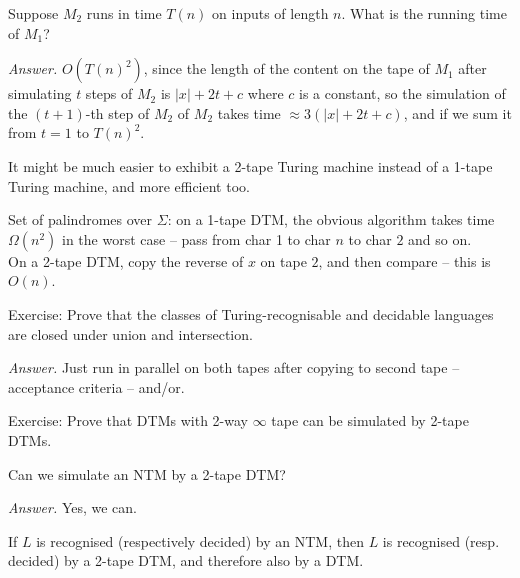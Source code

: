 \documentclass[a4paper]{article}
\newenvironment{ans}{\begin{breakbox}\textit{Answer.}}{\end{breakbox}}
\newcommand{\nl}{\vspace{0.2cm}\\}
\begin{document}
\begin{ques}
    Suppose $M_2$ runs in time $T(n)$ on inputs of length $n$. What is the running time of $M_1$?
\end{ques}

\begin{ans}
    $O(T(n)^2)$, since the length of the content on the tape of $M_1$ after simulating $t$ steps of $M_2$ is $|x| + 2t + c$ where $c$ is a constant, so the simulation of the $(t + 1)$-th step
    of $M_2$ of $M_2$ takes time $\approx 3(|x| + 2t + c)$, and if we sum it from $t = 1$ to $T(n)^2$.
\end{ans}

\begin{note}
    It might be much easier to exhibit a 2-tape Turing machine instead of a 1-tape Turing machine, and more efficient too.
\end{note}
\begin{eg}
    Set of palindromes over $\Sigma$: on a 1-tape DTM, the obvious algorithm takes time $\Omega(n^2)$ in the worst case -- pass from char 1 to char $n$ to char $2$ and so on.\nl
    On a 2-tape DTM, copy the reverse of $x$ on tape $2$, and then compare -- this is $O(n)$.
\end{eg}

Exercise: Prove that the classes of Turing-recognisable and decidable languages are closed under union and intersection.
\begin{ans}
    Just run in parallel on both tapes after copying to second tape -- acceptance criteria -- and/or.
\end{ans}

Exercise: Prove that DTMs with 2-way $\infty$ tape can be simulated by 2-tape DTMs.\nl

\begin{ques}
    Can we simulate an NTM by a 2-tape DTM?
\end{ques}
\begin{ans}
    Yes, we can.
\end{ans}

\begin{theorem}
    If $L$ is recognised (respectively decided) by an NTM, then $L$ is recognised (resp. decided) by a 2-tape DTM, and therefore also by a DTM.
\end{theorem}
\end{document}

